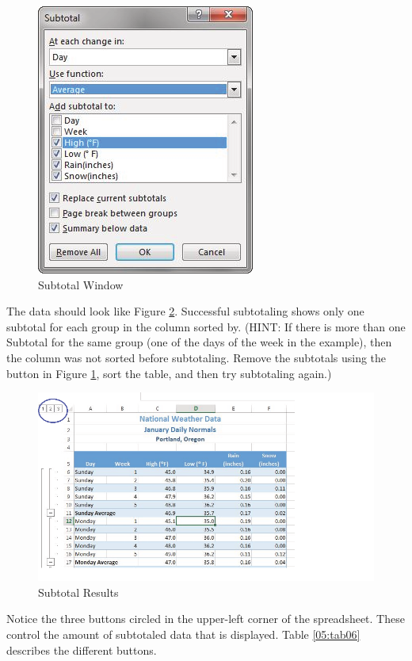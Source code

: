 \begin{figure}[H]
	\centering
	\includegraphics[width=\maxwidth{.95\linewidth}]{gfx/ch05_fig24}
	\caption{Subtotal Window}
	\label{05:fig24}
\end{figure}

The data should look like Figure \ref{05:fig25}. Successful subtotaling shows only one subtotal for each group in the column sorted by. (HINT: If there is more than one Subtotal for the same group (\ie one of the days of the week in the example), then the column was not sorted before subtotaling. Remove the subtotals using the  button in Figure \ref{05:fig24}, sort the table, and then try subtotaling again.)

\begin{figure}[H]
	\centering
	\includegraphics[width=\maxwidth{.95\linewidth}]{gfx/ch05_fig25}
	\caption{Subtotal Results}
	\label{05:fig25}
\end{figure}

Notice the three  buttons circled in the upper-left corner of the spreadsheet. These control the amount of subtotaled data that is displayed. Table \ref{05:tab06} describes the different  buttons.

